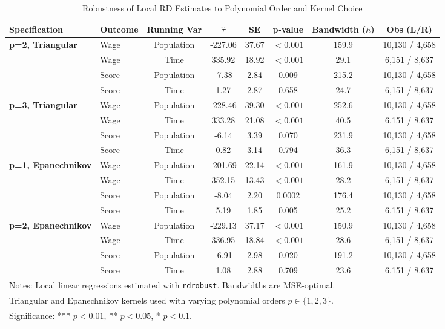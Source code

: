 \documentclass{article}
\begin{document}
\begin{table}[H]
\centering
\caption{Robustness of Local RD Estimates to Polynomial Order and Kernel Choice}
\label{tab:rd_robustness}
\begin{tabular}{llcccccc}
\hline
Specification & Outcome & Running Var & $\hat{\tau}$ & SE & p-value & Bandwidth ($h$) & Obs (L/R) \\
\hline
\textbf{p=2, Triangular} & Wage & Population & -227.06 & 37.67 & $<0.001$ & 159.9 & 10,130 / 4,658 \\
                         & Wage & Time       & 335.92  & 18.92 & $<0.001$ & 29.1  & 6,151 / 8,637 \\
                         & Score & Population & -7.38  & 2.84 & 0.009 & 215.2 & 10,130 / 4,658 \\
                         & Score & Time       & 1.27   & 2.87 & 0.658 & 24.7 & 6,151 / 8,637 \\
\textbf{p=3, Triangular} & Wage & Population & -228.46 & 39.30 & $<0.001$ & 252.6 & 10,130 / 4,658 \\
                         & Wage & Time       & 333.28  & 21.08 & $<0.001$ & 40.5  & 6,151 / 8,637 \\
                         & Score & Population & -6.14  & 3.39 & 0.070 & 231.9 & 10,130 / 4,658 \\
                         & Score & Time       & 0.82   & 3.14 & 0.794 & 36.3 & 6,151 / 8,637 \\
\textbf{p=1, Epanechnikov} & Wage & Population & -201.69 & 22.14 & $<0.001$ & 161.9 & 10,130 / 4,658 \\
                           & Wage & Time       & 352.15  & 13.43 & $<0.001$ & 28.2  & 6,151 / 8,637 \\
                           & Score & Population & -8.04  & 2.20 & 0.0002 & 176.4 & 10,130 / 4,658 \\
                           & Score & Time       & 5.19   & 1.85 & 0.005 & 25.2 & 6,151 / 8,637 \\
\textbf{p=2, Epanechnikov} & Wage & Population & -229.13 & 37.17 & $<0.001$ & 150.9 & 10,130 / 4,658 \\
                           & Wage & Time       & 336.95  & 18.84 & $<0.001$ & 28.6  & 6,151 / 8,637 \\
                           & Score & Population & -6.91  & 2.98 & 0.020 & 191.2 & 10,130 / 4,658 \\
                           & Score & Time       & 1.08   & 2.88 & 0.709 & 23.6 & 6,151 / 8,637 \\
\hline
\multicolumn{8}{l}{\footnotesize Notes: Local linear regressions estimated with \texttt{rdrobust}. Bandwidths are MSE-optimal.}\\
\multicolumn{8}{l}{\footnotesize Triangular and Epanechnikov kernels used with varying polynomial orders $p \in \{1,2,3\}$.}\\
\multicolumn{8}{l}{\footnotesize Significance: *** $p<0.01$, ** $p<0.05$, * $p<0.1$.}\\
\end{tabular}
\end{table}
\end{document}
